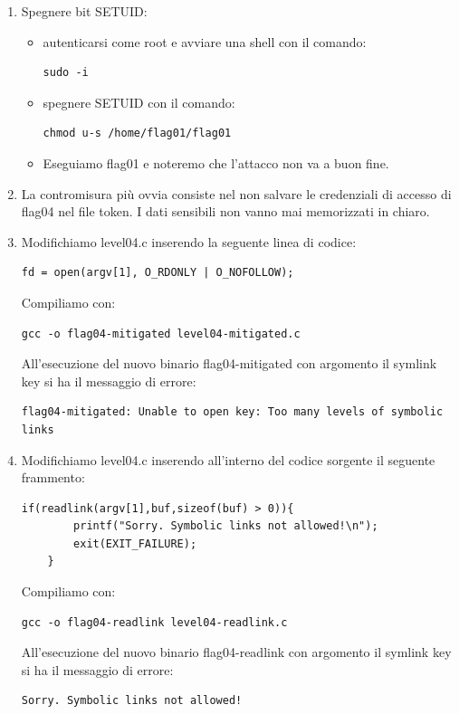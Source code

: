 \begin{enumerate}
    \item Spegnere bit SETUID:
    \begin{itemize}
        \item autenticarsi come root e avviare una shell con il comando: \begin{lstlisting}[style=bashstyle] 
        sudo -i
        \end{lstlisting}
        \item spegnere SETUID con il comando: \begin{lstlisting}[style=bashstyle] 
        chmod u-s /home/flag01/flag01
        \end{lstlisting}   
        \item Eseguiamo flag01 e noteremo che l’attacco non va a buon fine. 
    \end{itemize}
    \item La contromisura più ovvia consiste nel non salvare le credenziali di accesso di flag04 nel file token. I dati sensibili non vanno mai memorizzati in chiaro.
    \item Modifichiamo level04.c inserendo la seguente linea di codice:
    \begin{lstlisting}[style=cstyle]
    fd = open(argv[1], O_RDONLY | O_NOFOLLOW);
    \end{lstlisting}
    Compiliamo con:
    \begin{lstlisting}[style=bashstyle]
    gcc -o flag04-mitigated level04-mitigated.c
    \end{lstlisting}
    All'esecuzione del nuovo binario flag04-mitigated con argomento il symlink key si ha il messaggio di errore:
    \begin{lstlisting}[style=bashstyle]
    flag04-mitigated: Unable to open key: Too many levels of symbolic links
    \end{lstlisting} 
    \item Modifichiamo level04.c inserendo all'interno del codice sorgente il seguente frammento: 
    \begin{lstlisting}[style=cstyle]
    if(readlink(argv[1],buf,sizeof(buf) > 0)){
        printf("Sorry. Symbolic links not allowed!\n");
        exit(EXIT_FAILURE); 
    }
    \end{lstlisting} 
    Compiliamo con:
    \begin{lstlisting}[style=bashstyle]
    gcc -o flag04-readlink level04-readlink.c
    \end{lstlisting}
    All'esecuzione del nuovo binario flag04-readlink con argomento il symlink key si ha il messaggio di errore:
    \begin{lstlisting}[style=bashstyle]
    Sorry. Symbolic links not allowed!
    \end{lstlisting} 
\end{enumerate}

